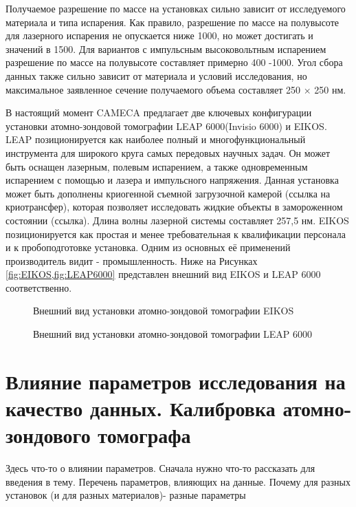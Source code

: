 Получаемое разрешение по массе на установках сильно зависит от исследуемого материала и типа испарения. Как правило, разрешение по массе на полувысоте для лазерного испарения не опускается ниже 1000, но может достигать и значений в 1500. Для вариантов с импульсным высоковольтным  испарением разрешение по массе на полувысоте составляет примерно 400 -1000. Угол сбора данных также сильно зависит от материала и условий исследования, но максимальное заявленное сечение получаемого объема составляет 250 × 250 нм.

В настоящий момент CAMECA предлагает две ключевых конфигурации установки атомно-зондовой томографии LEAP 6000(Invisio 6000) и EIKOS. LEAP позиционируется как наиболее полный и многофункциональный инструмента для широкого круга самых передовых научных задач. Он может быть оснащен лазерным, полевым испарением, а также одновременным испарением с помощью и лазера и импульсного напряжения. Данная установка может быть дополнены криогенной съемной загрузочной камерой (ссылка на криотрансфер), которая позволяет исследовать жидкие объекты в замороженном состоянии (ссылка). Длина волны лазерной системы составляет 257,5 нм. EIKOS  позиционируется как простая и менее требовательная к квалификации персонала и к пробоподготовке установка. Одним из основных её применений производитель видит - промышленность. Ниже на Рисунках \cref{fig:EIKOS,fig:LEAP6000} представлен внешний вид EIKOS и LEAP 6000 соответственно.

\begin{figure}[htb]
	\caption{Внешний вид установки атомно-зондовой томографии EIKOS}
	\label{fig:EIKOS}
\end{figure}

\begin{figure}[htb]
	\caption{Внешний вид установки атомно-зондовой томографии LEAP 6000}
	\label{fig:LEAP6000}
\end{figure}

\FloatBarrier



\section{Влияние параметров исследования на качество данных. Калибровка атомно-зондового томографа}\label{sec:ch1/sec5}

Здесь что-то о влиянии параметров.
Сначала нужно что-то рассказать для введения в тему.
Перечень параметров, влияющих на данные.
Почему для разных установок (и для разных материалов)- разные параметры

